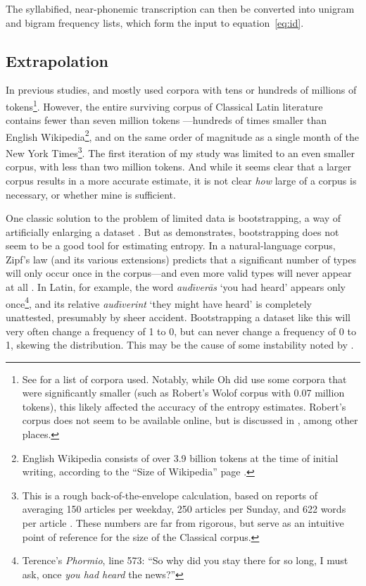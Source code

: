\documentclass[12pt,twoside,leqno]{article} %
\begin{document}
The syllabified, near-phonemic transcription can then be converted into unigram and bigram frequency lists, which form the input to equation~\ref{eq:id}.

\subsection{Extrapolation}
\label{subsec:extrapolate}

In previous studies, \citet{coupé} and \citet{oh} mostly used corpora with tens or hundreds of millions of tokens\footnote{See \citereset\citet[30-31]{oh} for a list of corpora used. Notably, while Oh did use some corpora that were significantly smaller (such as Robert's Wolof corpus with 0.07 million tokens), this likely affected the accuracy of the entropy estimates. Robert's corpus does not seem to be available online, but is discussed in \citet{robert}, among other places.}. However, the entire surviving corpus of Classical Latin literature contains fewer than seven million tokens \citep{phi}---hundreds of times smaller than English Wikipedia\footnote{English Wikipedia consists of over 3.9 billion tokens at the time of initial writing, according to the ``Size of Wikipedia'' page \citep{wiki}.}, and on the same order of magnitude as a single month of the New York Times\footnote{This is a rough back-of-the-envelope calculation, based on reports of averaging 150 articles per weekday, 250 articles per Sunday, and 622 words per article \citep{meyer,menendez}. These numbers are far from rigorous, but serve as an intuitive point of reference for the size of the Classical corpus.}. The first iteration of my study was limited to an even smaller corpus, with less than two million tokens. And while it seems clear that a larger corpus results in a more accurate estimate, it is not clear \emph{how} large of a corpus is necessary, or whether mine is sufficient.

One classic solution to the problem of limited data is bootstrapping, a way of artificially enlarging a dataset \citep{oh,efron}. But as \citet[55-56]{oh} demonstrates, bootstrapping does not seem to be a good tool for estimating entropy. In a natural-language corpus, Zipf's law (and its various extensions) predicts that a significant number of types will only occur once in the corpus---and even more valid types will never appear at all \citep{davis}. In Latin, for example, the word \emph{aud\=\i{}ver\=as} `you had heard' appears only once\footnote{Terence's \emph{Phormio}, line 573: ``So why did you stay there for so long, I must ask, once \emph{you had heard} the news?''}, and its relative \emph{aud\=\i{}verint} `they might have heard' is completely unattested, presumably by sheer accident. Bootstrapping a dataset like this will very often change a frequency of 1 to 0, but can never change a frequency of 0 to 1, skewing the distribution. This may be the cause of some instability noted by \citet[56]{oh}.
\end{document}

